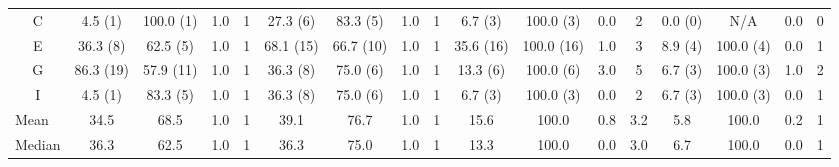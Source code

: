 \begin{landscape}
\begin{table}
{\begin{tabular}{@{}ccccccccccccccccc@{}}
        \multicolumn{1}{c|}{C}              & 4.5 (1)   & 100.0 (1) & 1.0  & \multicolumn{1}{c|}{1}    & 27.3 (6)                 & 83.3 (5)                 & 1.0                      & \multicolumn{1}{c|}{1}    & 6.7 (3)   & 100.0 (3)                & 0.0                      & \multicolumn{1}{c|}{2}    & 0.0 (0)                  & N/A                      & 0.0                      & 0                        \\
        \multicolumn{1}{c|}{E}              & 36.3 (8)  & 62.5 (5)  & 1.0  & \multicolumn{1}{c|}{1}    & 68.1 (15)                & 66.7 (10)                & 1.0                      & \multicolumn{1}{c|}{1}    & 35.6 (16) & 100.0 (16)               & 1.0                      & \multicolumn{1}{c|}{3}    & 8.9 (4)                  & 100.0 (4)                & 0.0                      & 1                        \\
        \multicolumn{1}{c|}{G}              & 86.3 (19) & 57.9 (11) & 1.0  & \multicolumn{1}{c|}{1}    & 36.3 (8)                 & 75.0 (6)                 & 1.0                      & \multicolumn{1}{c|}{1}    & 13.3 (6)  & 100.0 (6)                & 3.0                      & \multicolumn{1}{c|}{5}    & 6.7 (3)                  & 100.0 (3)                & 1.0                      & 2                        \\
        \multicolumn{1}{c|}{I}              & 4.5 (1)   & 83.3 (5)  & 1.0  & \multicolumn{1}{c|}{1}    & 36.3 (8)                 & 75.0 (6)                 & 1.0                      & \multicolumn{1}{c|}{1}    & 6.7 (3)   & 100.0 (3)                & 0.0                      & \multicolumn{1}{c|}{2}    & 6.7 (3)                  & 100.0 (3)                & 0.0                      & 1                        \\ \midrule
        \multicolumn{1}{l|}{Mean}           & 34.5      & 68.5      & 1.0  & \multicolumn{1}{c|}{1}    & 39.1                     & 76.7                     & 1.0                      & \multicolumn{1}{c|}{1}    & 15.6      & 100.0                    & 0.8                      & \multicolumn{1}{c|}{3.2}  & 5.8                      & 100.0                    & 0.2                      & 1                        \\
        \multicolumn{1}{l|}{Median}         & 36.3      & 62.5      & 1.0  & \multicolumn{1}{c|}{1}    & 36.3                     & 75.0                     & 1.0                      & \multicolumn{1}{c|}{1}    & 13.3      & 100.0                    & 0.0                      & \multicolumn{1}{c|}{3.0}  & 6.7                      & 100.0                    & 0.0                      & 1                        \\ \bottomrule
      \end{tabular}
    }%
    \label{tab:Results-Quantitative-AB}
  \end{table}
\end{landscape}

